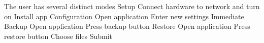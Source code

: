 The user has several distinct modes
	Setup
		Connect hardware to network and turn on
		Install app
	Configuration
		Open application
		Enter new settings
	Immediate Backup
		Open application
		Press backup button
	Restore
		Open application
		Press restore button
		Choose files
		Submit
